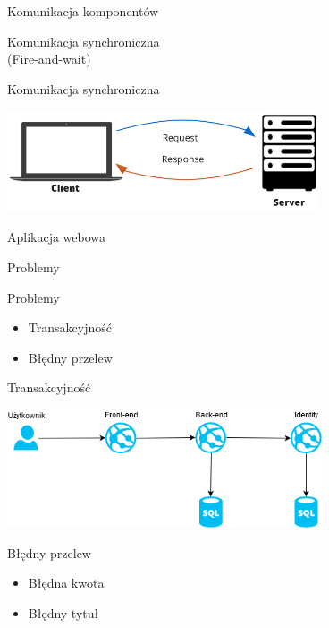 \documentclass{beamer}
\begin{document}
\begin{frame}{Komunikacja komponentów}
	\begin{center}
		\Huge{Komunikacja synchroniczna}\\
		\huge{(Fire-and-wait)}
	\end{center}
\end{frame}

\begin{frame}{Komunikacja synchroniczna}
	\begin{center}
		\includegraphics[height=3cm]{prosta_komunikacja2.png}
	\end{center}
\end{frame}

\begin{frame}{Aplikacja webowa}
	\begin{center}
		\Huge{Problemy}
	\end{center}
\end{frame}

\begin{frame}{Problemy}
	\begin{huge}
		\begin{itemize}[<+->]
			\item Transakcyjność
			\item Błędny przelew
		\end{itemize}
	\end{huge}
\end{frame}

\begin{frame}{Transakcyjność}
	\begin{center}
		\includegraphics[height=3.5cm]{transaction2.png}
	\end{center}
\end{frame}

\begin{frame}{Błędny przelew}
	\begin{huge}
		\begin{itemize}[<+->]
			\item Błędna kwota
			\item Błędny tytuł
		\end{itemize}
	\end{huge}
\end{frame}
\end{document}
